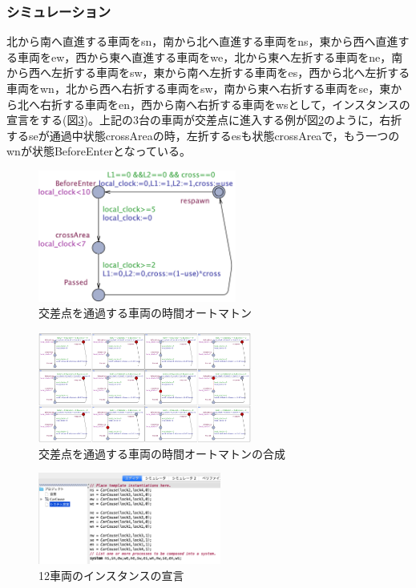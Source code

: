 \documentclass[twocolumn,10pt]{jsarticle}
\begin{document}
	\subsubsection{シミュレーション}
	北から南へ直進する車両をsn，南から北へ直進する車両をns，東から西へ直進する車両をew，西から東へ直進する車両をwe，北から東へ左折する車両をne，南から西へ左折する車両をsw，東から南へ左折する車両をes，西から北へ左折する車両をwn，北から西へ右折する車両をsw，南から東へ右折する車両をse，東から北へ右折する車両をen，西から南へ右折する車両をwsとして，インスタンスの宣言をする(図\ref{SimpleSD})。上記の3台の車両が交差点に進入する例が図\ref{SimpleS}のように，右折するseが通過中状態crossAreaの時，左折するesも状態crossAreaで，もう一つのwnが状態BeforeEnterとなっている。
	\begin{figure}[htbp]
	\centering
	\includegraphics[width=65mm]{SimpleIntersection.png}
	\caption{交差点を通過する車両の時間オートマトン}
	\label{Simple}
	\end{figure}
	\begin{figure}[htbp]
	\centering
	\includegraphics[width=70mm]{SimpleIntersectionSimu.png}
	\caption{交差点を通過する車両の時間オートマトンの合成}
	\label{SimpleS}
	\end{figure}
	\begin{figure}[htbp]
	\centering
	\includegraphics[width=60mm]{SimpleSD.png}
	\caption{12車両のインスタンスの宣言}
	\label{SimpleSD}
	\end{figure}
\end{document}

